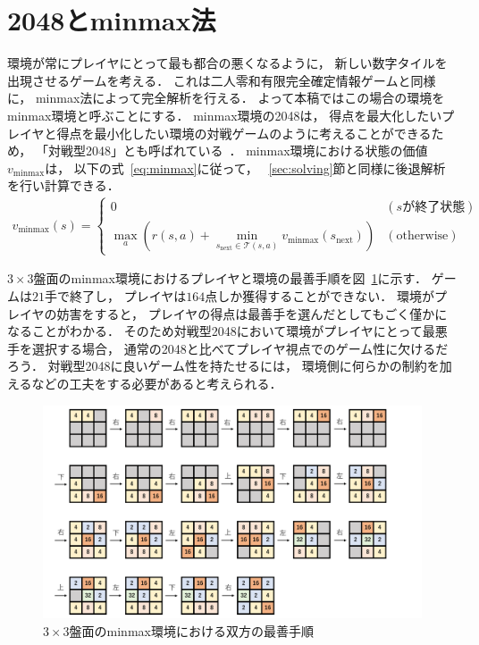 \section{2048とminmax法}
環境が常にプレイヤにとって最も都合の悪くなるように， 新しい数字タイルを出現させるゲームを考える．
これは二人零和有限完全確定情報ゲームと同様に， minmax法によって完全解析を行える．
よって本稿ではこの場合の環境をminmax環境と呼ぶことにする．
minmax環境の2048は， 得点を最大化したいプレイヤと得点を最小化したい環境の対戦ゲームのように考えることができるため， 「対戦型2048」とも呼ばれている~\cite{battle_2048}．
minmax環境における状態の価値$v_{\text{minmax}}$は， 以下の式~\ref{eq:minmax}に従って， ~\ref{sec:solving}節と同様に後退解析を行い計算できる．
\begin{align}
    v_{\text{minmax}}(s) =
    \begin{cases}
        0 & (s \text{が終了状態}) \\
        \max_a \left(r(s,a) + \min_{s_\text{next} \in \mathcal{T}(s,a)} v_{\text{minmax}}(s_\text{next}) \right) & (\text{otherwise})
    \end{cases}
    \label{eq:minmax}
\end{align}

$3\times3$盤面のminmax環境におけるプレイヤと環境の最善手順を図~\ref{fig:minmax_env}に示す．
ゲームは$21$手で終了し， プレイヤは$164$点しか獲得することができない．
環境がプレイヤの妨害をすると， プレイヤの得点は最善手を選んだとしてもごく僅かになることがわかる．
そのため対戦型2048において環境がプレイヤにとって最悪手を選択する場合， 通常の2048と比べてプレイヤ視点でのゲーム性に欠けるだろう．
対戦型2048に良いゲーム性を持たせるには， 環境側に何らかの制約を加えるなどの工夫をする必要があると考えられる．
\begin{figure}[t]
    \centering
    \includegraphics[width=\linewidth{}]{figures/minmax_transition.pdf}
    \caption{$3\times3$盤面のminmax環境における双方の最善手順}
    \label{fig:minmax_env}
\end{figure}


